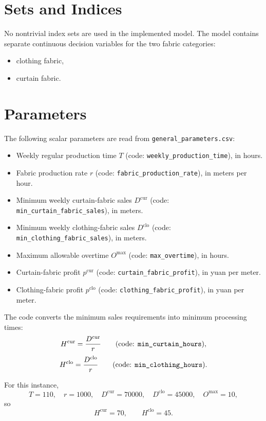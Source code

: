 \section*{Sets and Indices}

No nontrivial index sets are used in the implemented model. The model contains separate continuous decision variables for the two fabric categories:
\begin{itemize}
    \item clothing fabric,
    \item curtain fabric.
\end{itemize}

\section*{Parameters}

The following scalar parameters are read from \texttt{general\_parameters.csv}:
\begin{itemize}
    \item Weekly regular production time $T$ (code: \texttt{weekly\_production\_time}), in hours.
    \item Fabric production rate $r$ (code: \texttt{fabric\_production\_rate}), in meters per hour.
    \item Minimum weekly curtain-fabric sales $D^{\mathrm{cur}}$ (code: \texttt{min\_curtain\_fabric\_sales}), in meters.
    \item Minimum weekly clothing-fabric sales $D^{\mathrm{clo}}$ (code: \texttt{min\_clothing\_fabric\_sales}), in meters.
    \item Maximum allowable overtime $O^{\max}$ (code: \texttt{max\_overtime}), in hours.
    \item Curtain-fabric profit $p^{\mathrm{cur}}$ (code: \texttt{curtain\_fabric\_profit}), in yuan per meter.
    \item Clothing-fabric profit $p^{\mathrm{clo}}$ (code: \texttt{clothing\_fabric\_profit}), in yuan per meter.
\end{itemize}

The code converts the minimum sales requirements into minimum processing times:
\[
H^{\mathrm{cur}} = \frac{D^{\mathrm{cur}}}{r}
\qquad\text{(code: \texttt{min\_curtain\_hours})},
\]
\[
H^{\mathrm{clo}} = \frac{D^{\mathrm{clo}}}{r}
\qquad\text{(code: \texttt{min\_clothing\_hours})}.
\]

For this instance,
\[
T=110,\quad r=1000,\quad D^{\mathrm{cur}}=70000,\quad D^{\mathrm{clo}}=45000,\quad O^{\max}=10,
\]
so
\[
H^{\mathrm{cur}}=70,\qquad H^{\mathrm{clo}}=45.
\]

